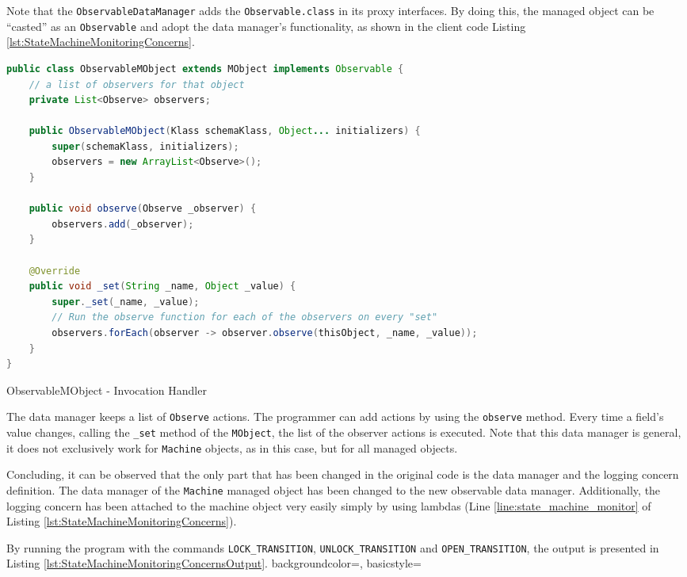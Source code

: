 Note that the \texttt{ObservableDataManager} adds the \texttt{Observable.class} in its proxy interfaces.
By doing this, the managed object can be ``casted'' as an \texttt{Observable} and adopt the data manager's functionality, as shown in the client code Listing \ref{lst:StateMachineMonitoringConcerns}.

\begin{sourcecode} [H]
	\begin{lstlisting}[language=Java, escapechar=|]
public class ObservableMObject extends MObject implements Observable {
	// a list of observers for that object
	private List<Observe> observers;

	public ObservableMObject(Klass schemaKlass, Object... initializers) {
		super(schemaKlass, initializers);
		observers = new ArrayList<Observe>();
	}

	public void observe(Observe _observer) {
		observers.add(_observer);
	}

	@Override
	public void _set(String _name, Object _value) {
		super._set(_name, _value);
		// Run the observe function for each of the observers on every "set"
		observers.forEach(observer -> observer.observe(thisObject, _name, _value));
	}
}
	\end{lstlisting}
	\caption{ObservableMObject - Invocation Handler}
	\label{lst:ObservableMObject}
\end{sourcecode}

The data manager keeps a list of \texttt{Observe} actions.
The programmer can add actions by using the \texttt{observe} method.
Every time a field's value changes, calling the \texttt{\_set} method of the \texttt{MObject}, the list of the observer actions is executed.
Note that this data manager is general, it does not exclusively work for \texttt{Machine} objects, as in this case, but for all managed objects.

Concluding, it can be observed that the only part that has been changed in the original code is the data manager and the logging concern definition.
The data manager of the \texttt{Machine} managed object has been changed to the new observable data manager.
Additionally, the logging concern has been attached to the machine object very easily simply by using lambdas (Line \ref{line:state_machine_monitor} of Listing \ref{lst:StateMachineMonitoringConcerns}).

By running the program with the commands \texttt{LOCK\_TRANSITION}, \texttt{UNLOCK\_TRANSITION} and \texttt{OPEN\_TRANSITION}, the output is presented in Listing \ref{lst:StateMachineMonitoringConcernsOutput}.
 {
    backgroundcolor=\color{white},
    basicstyle=\scriptsize\color{black}\ttfamily
}

